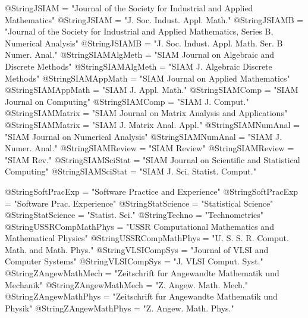  @String{JSIAM = "Journal of the Society for Industrial and Applied
     Mathematics" }
 @String{JSIAM = "J. Soc. Indust. Appl. Math." }
 @String{JSIAMB = "Journal of the Society for Industrial and Applied
     Mathematics, Series B, Numerical Analysis" }
 @String{JSIAMB = "J. Soc. Indust. Appl. Math. Ser. B Numer. Anal." }
 @String{SIAMAlgMeth = "{SIAM} Journal on Algebraic and Discrete Methods" }
 @String{SIAMAlgMeth = "{SIAM} J. Algebraic Discrete Methods" }
 @String{SIAMAppMath = "{SIAM} Journal on Applied Mathematics" }
 @String{SIAMAppMath = "{SIAM} J. Appl. Math." }
 @String{SIAMComp = "{SIAM} Journal on Computing" }
 @String{SIAMComp = "{SIAM} J. Comput." }
 @String{SIAMMatrix = "{SIAM} Journal on Matrix Analysis and Applications" }
 @String{SIAMMatrix = "{SIAM} J. Matrix Anal. Appl." }
 @String{SIAMNumAnal = "{SIAM} Journal on Numerical Analysis" }
 @String{SIAMNumAnal = "{SIAM} J. Numer. Anal." }
 @String{SIAMReview = "{SIAM} Review" }
 @String{SIAMReview = "{SIAM} Rev." }
 @String{SIAMSciStat = "{SIAM} Journal on Scientific and Statistical
     Computing" }
 @String{SIAMSciStat = "{SIAM} J. Sci. Statist. Comput." }

 @String{SoftPracExp = "Software Practice and Experience" }
 @String{SoftPracExp = "Software Prac. Experience" } %
 @String{StatScience = "Statistical Science" }
 @String{StatScience = "Statist. Sci." }
 @String{Techno = "Technometrics" }
 @String{USSRCompMathPhys = "{USSR} Computational Mathematics and Mathematical
     Physics" }
 @String{USSRCompMathPhys = "{U. S. S. R.} Comput. Math. and Math. Phys." }
 @String{VLSICompSys = "Journal of {VLSI} and Computer Systems" }
 @String{VLSICompSys = "J. {VLSI} Comput. Syst." }
 @String{ZAngewMathMech = "Zeitschrift fur Angewandte Mathematik und
     Mechanik" }
 @String{ZAngewMathMech = "Z. Angew. Math. Mech." }
 @String{ZAngewMathPhys = "Zeitschrift fur Angewandte Mathematik und Physik" }
 @String{ZAngewMathPhys = "Z. Angew. Math. Phys." }


